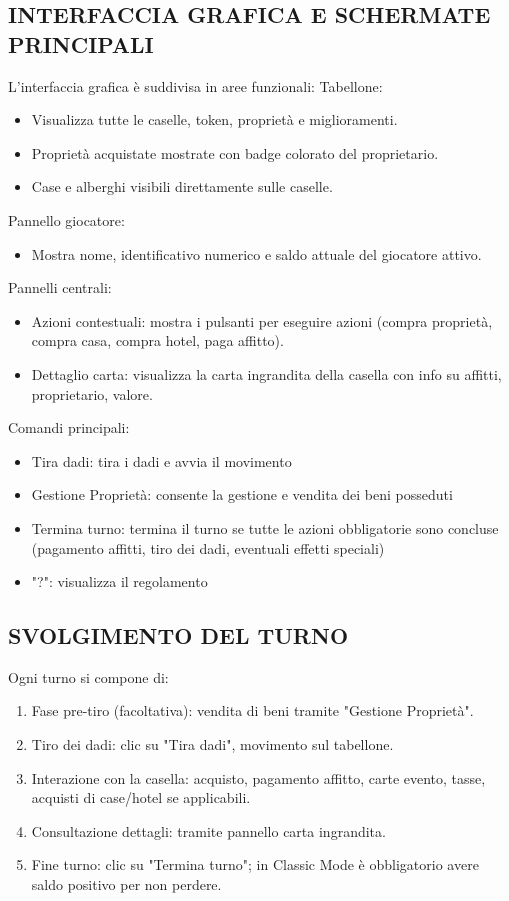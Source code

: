\subsection{INTERFACCIA GRAFICA E SCHERMATE PRINCIPALI}
L’interfaccia grafica è suddivisa in aree funzionali:\newline
Tabellone:\newline
\begin{itemize}
    \item Visualizza tutte le caselle, token, proprietà e miglioramenti.
    \item Proprietà acquistate mostrate con badge colorato del proprietario.
    \item Case e alberghi visibili direttamente sulle caselle.
\end{itemize}
Pannello giocatore:\newline
\begin{itemize}
    \item Mostra nome, identificativo numerico e saldo attuale del giocatore attivo.
\end{itemize}
Pannelli centrali:\newline
\begin{itemize}
    \item Azioni contestuali: mostra i pulsanti per eseguire azioni (compra proprietà, compra casa, compra hotel, paga affitto).
    \item Dettaglio carta: visualizza la carta ingrandita della casella con info su affitti, proprietario, valore.
\end{itemize}
Comandi principali:\newline
\begin{itemize}
    \item Tira dadi: tira i dadi e avvia il movimento
    \item Gestione Proprietà: consente la gestione e vendita dei beni posseduti
    \item Termina turno: termina il turno se tutte le azioni obbligatorie sono concluse (pagamento affitti, tiro dei dadi, eventuali effetti speciali)
    \item "?": visualizza il regolamento
\end{itemize}
\subsection{SVOLGIMENTO DEL TURNO}
Ogni turno si compone di:
\begin{enumerate}
    \item Fase pre-tiro (facoltativa): vendita di beni tramite "Gestione Proprietà".
    \item Tiro dei dadi: clic su "Tira dadi", movimento sul tabellone.
    \item Interazione con la casella: acquisto, pagamento affitto, carte evento, tasse, acquisti di case/hotel se applicabili.
    \item Consultazione dettagli: tramite pannello carta ingrandita.
    \item Fine turno: clic su "Termina turno"; in Classic Mode è obbligatorio avere saldo positivo per non perdere.
\end{enumerate}
